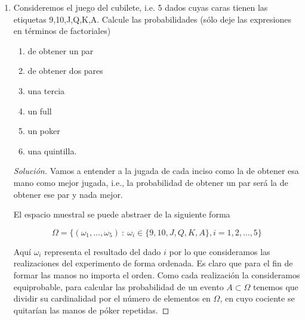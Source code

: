 \documentclass{article}
\renewcommand{\P}[1]{P\left(#1\right)}
\begin{document}
\begin{enumerate}
\begin{proof}[Solución]
        \textbf{Bonus:} El desarrollo en serie de potencias para la función $e^x$ es,

        \[ e^x = \sum_{m=0}^\infty \frac{x^m}{m!}. \]

        Al hacer $n\to\infty$ en la expresión que tenemos para $\P{N}$, encontramos que 

        \begin{equation*}
            \lim_{n\to\infty} \P{N} = \lim_{n\to\infty} \sum_{m=0}^n \frac{(-1)^m}{m!} = \sum_{m=0}^\infty \frac{(-1)^m}{m!} = e^{-1}.
        \end{equation*}
        

    \end{proof}

    \item Consideremos el juego del cubilete, i.e. 5 dados cuyas caras tienen las etiquetas 9,10,J,Q,K,A. Calcule las probabilidades (sólo deje las expresiones en términos de factoriales)
    \begin{enumerate}
        \item de obtener un par
        \item de obtener dos pares
        \item una tercia
        \item un full
        \item un poker
        \item una quintilla.
    \end{enumerate}


    \begin{proof}[Solución]
        Vamos a entender a la jugada de cada inciso como la de obtener esa mano como mejor jugada, i.e., la probabilidad de obtener un par será la de obtener ese par y nada mejor. 

El espacio muestral se puede abstraer de la siguiente forma

\begin{equation*}
    \Omega=\{(\omega_1,\dots,\omega_5)\ :\ \omega_i\in\{9,10,J,Q,K,A\},i=1,2,\dots,5\}
\end{equation*}

Aquí $\omega_i$ representa el resultado del dado $i$ por lo que consideramos las realizaciones del experimento de forma ordenada. Es claro que para el fin de formar las manos no importa el orden. Como cada realización la consideramos equiprobable, para calcular las probabilidad de un evento $A\subset \Omega$ tenemos que dividir su cardinalidad por el número de elementos en $\Omega$, en cuyo cociente se quitarían las manos de póker repetidas.


\end{proof}
\end{enumerate}
\end{document}
